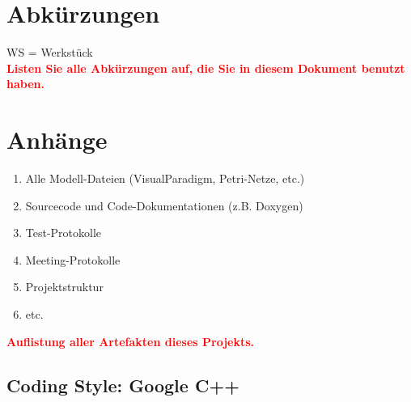 \documentclass[oneside,a4paper,titlepage]{scrartcl} %
\begin{document}
\section{Abkürzungen}
WS = Werkstück\\
\textcolor{red}{\textbf{Listen Sie alle Abkürzungen auf, die Sie in diesem Dokument benutzt haben.}}

\section{Anhänge}
\begin{enumerate}
 \item Alle Modell-Dateien (VisualParadigm, Petri-Netze, etc.)
 \item Sourcecode und Code-Dokumentationen (z.B. Doxygen)
 \item Test-Protokolle
 \item Meeting-Protokolle
 \item Projektstruktur
 \item etc.
\end{enumerate}
\textcolor{red}{\textbf{Auflistung aller Artefakten dieses Projekts.}}

\newpage

\subsection{Coding Style: Google C++}

\end{document}
